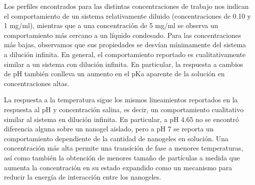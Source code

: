 	Los perfiles encontrados para las distintas concentraciones de trabajo nos indican el comportamiento de un sistema relativamente diluido (concentraciones de 0.10 y 1 mg/ml), mientras que a una concentraci\'on de 5 mg/ml se observa un comportamiento m\'as cercano a un l\'iquido condesado. Para las concentraciones m\'as bajas, observamos que sus propiedades se desv\'ian m\'inimamente del sistema a diluci\'on infinita. 
	 En general, el comportamiento reportado es cualitativamente similar a un sistema con diluci\'on infinita. En particular, la respuesta a cambios de pH tambi\'en conlleva un aumento en el pKa aparente de la soluci\'on en concentraciones altas.
	
	La respuesta a la temperatura sigue los mismos lineamientos reportados en la respuesta al pH y concentraci\'on salina, es decir, un comportamiento cualitativo similar al sistema en diluci\'on infinita. En particular, a pH 4.65 no se encontr\'o diferencia alguna sobre un nanogel aislado, pero a pH 7 se reporta un comportamiento dependiente de la cantidad de nanogeles en soluci\'on. Una concentraci\'on m\'as alta permite una transici\'on de fase a menores temperaturas, as\'i como tambi\'en la obtenci\'on de menores tama\~no de part\'iculas a medida que aumenta la concentraci\'on en su estado expandido como un mecanismo para reducir la energ\'ia de interacci\'on entre los nanogeles.
	
	
	
	
	
	
	